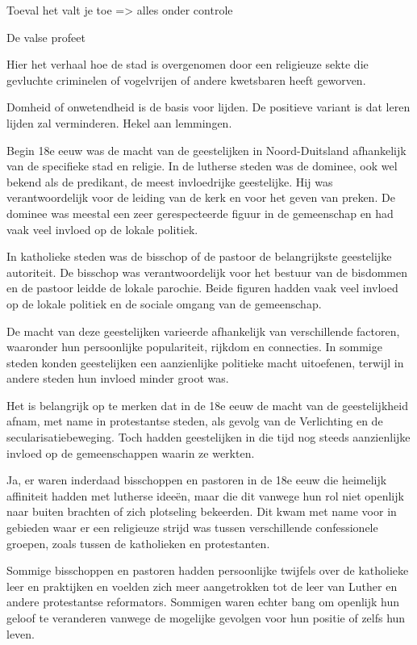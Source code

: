 Toeval het valt je toe => alles onder controle

De valse profeet

Hier het verhaal hoe de stad is overgenomen door een religieuze sekte die gevluchte criminelen of vogelvrijen of andere kwetsbaren heeft geworven.

Domheid of onwetendheid is de basis voor lijden. De positieve variant is dat leren lijden zal verminderen. Hekel aan lemmingen.

Begin 18e eeuw was de macht van de geestelijken in Noord-Duitsland afhankelijk van de specifieke stad en religie. In de lutherse steden was de dominee, ook wel bekend als de predikant, de meest invloedrijke geestelijke. Hij was verantwoordelijk voor de leiding van de kerk en voor het geven van preken. De dominee was meestal een zeer gerespecteerde figuur in de gemeenschap en had vaak veel invloed op de lokale politiek.

In katholieke steden was de bisschop of de pastoor de belangrijkste geestelijke autoriteit. De bisschop was verantwoordelijk voor het bestuur van de bisdommen en de pastoor leidde de lokale parochie. Beide figuren hadden vaak veel invloed op de lokale politiek en de sociale omgang van de gemeenschap.

De macht van deze geestelijken varieerde afhankelijk van verschillende factoren, waaronder hun persoonlijke populariteit, rijkdom en connecties. In sommige steden konden geestelijken een aanzienlijke politieke macht uitoefenen, terwijl in andere steden hun invloed minder groot was.

Het is belangrijk op te merken dat in de 18e eeuw de macht van de geestelijkheid afnam, met name in protestantse steden, als gevolg van de Verlichting en de secularisatiebeweging. Toch hadden geestelijken in die tijd nog steeds aanzienlijke invloed op de gemeenschappen waarin ze werkten.

Ja, er waren inderdaad bisschoppen en pastoren in de 18e eeuw die heimelijk affiniteit hadden met lutherse ideeën, maar die dit vanwege hun rol niet openlijk naar buiten brachten of zich plotseling bekeerden. Dit kwam met name voor in gebieden waar er een religieuze strijd was tussen verschillende confessionele groepen, zoals tussen de katholieken en protestanten.

Sommige bisschoppen en pastoren hadden persoonlijke twijfels over de katholieke leer en praktijken en voelden zich meer aangetrokken tot de leer van Luther en andere protestantse reformators. Sommigen waren echter bang om openlijk hun geloof te veranderen vanwege de mogelijke gevolgen voor hun positie of zelfs hun leven.

